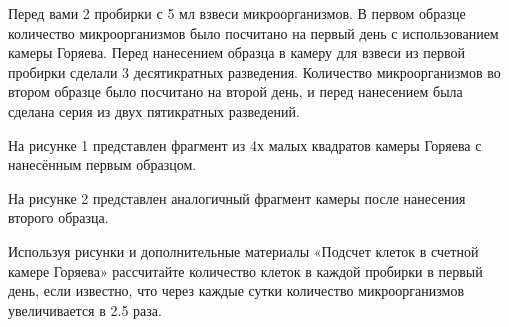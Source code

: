 
Перед вами 2 пробирки с 5 мл взвеси микроорганизмов. В первом образце количество микроорганизмов было посчитано на первый день с использованием камеры Горяева. Перед нанесением образца в камеру для взвеси из первой пробирки сделали 3 десятикратных разведения. Количество микроорганизмов во втором образце было посчитано на второй день, и перед нанесением была сделана серия из двух пятикратных разведений.

На рисунке 1 представлен фрагмент из 4х малых квадратов камеры Горяева с нанесённым первым образцом.

На рисунке 2 представлен аналогичный фрагмент камеры после нанесения второго образца.


Используя рисунки и дополнительные материалы «Подсчет клеток в счетной камере Горяева» рассчитайте количество клеток в каждой пробирки в первый день, если известно, что через каждые сутки количество микроорганизмов увеличивается в 2.5 раза.